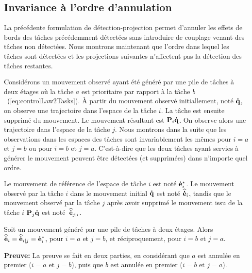 %
%

\subsection{Invariance à l'ordre d'annulation}
La précédente formulation de détection-projection permet d'annuler les effets de
bords des t\^aches précédemment détectées sans introduire de couplage venant des t\^aches
non détectées. Nous montrons maintenant que l'ordre dans lequel les t\^aches sont détectées
et les projections suivantes n'affectent pas la détection des t\^aches restantes.

Considérons un mouvement observé ayant été généré par une pile de t\^aches à
deux étages où la t\^ache $a$ est prioritaire
par rapport à la t\^ache $b$~(\ref{eq:controlLaw2Tasks}).
\`A partir du mouvement observé initiallement, noté ${\mathbf{\dot{q}}}$, on observe une trajectoire dans l'espace
de la t\^ache $i$. La t\^ache est ensuite supprimé du mouvement. Le mouvement
résultant est ${\mathbf{P}}_i {\mathbf{\dot{q}}}$. On observe alors une trajectoire dans l'espace de la tâche $j$.
Nous montrons dans la suite que les observations dans les espaces des t\^aches sont invariablement les mêmes
pour $i=a$ et $j=b$ ou pour $i=b$ et $j=a$. C'est-à-dire que 
les deux t\^aches ayant servies à générer le mouvement
peuvent \^etre détectées (et supprimées) dans n'importe quel
ordre.

Le mouvement de référence de l'espace de t\^ache $i$
est noté ${\mathbf{\dot{e}}}_{i}^*$. Le mouvement observé par la t\^ache $i$ dans le mouvement
initial ${\mathbf{\dot{q}}}$ est noté ${\mathbf{\widehat{\dot{e}}}}_{i}$, tandis que le mouvement observé par la t\^ache
$j$ après avoir supprimé le mouvement issu de la t\^ache $i$ ${\mathbf{P}}_{j} {\mathbf{\dot{q}}}$ est noté~${\mathbf{\widehat{\dot{e}}}}_{j|i}$.

\begin{proposition}
  Soit un mouvement généré par une pile de t\^aches à deux étages. Alors
${\mathbf{\widehat{\dot{e}}}}_{i} = {\mathbf{\widehat{\dot{e}}}}_{i|j} = {\mathbf{\dot{e}}}_{i}^*$, pour $i=a$ et $j=b$, et réciproquement, pour $i=b$ et $j=a$.
\end{proposition}
\noindent\textbf{Preuve:}
La preuve se fait en deux parties, en considérant que $a$ est annulée en premier ($i=a$ et $j=b$),
puis que $b$ est annulée en premier ($i=b$ et $j=a$).\\

